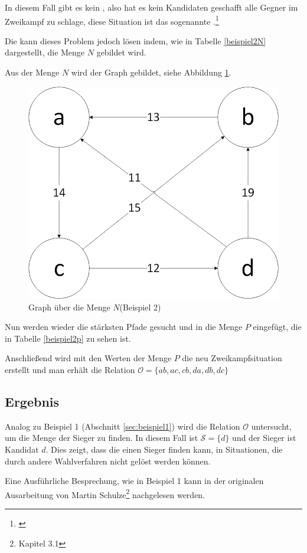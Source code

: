 In diesem Fall gibt es kein \condorcetSieger, also hat es kein Kandidaten geschafft alle Gegner im Zweikampf zu schlage, diese Situation ist das sogenannte \condorcetParadox.\footnote{\Vgl \citet{EnricoSchoebel2018}}

\newpage
Die \schulze kann dieses Problem jedoch lösen indem, wie in Tabelle \ref{beispiel2N} dargestellt, die Menge $N$ gebildet wird.



Aus der Menge $N$ wird der Graph gebildet, siehe Abbildung \ref{fig:graph2}.

\begin{figure}[!h]
\centering
\includegraphics[scale=0.5]{Bilder/Beispiel2_Graph.png}
\caption{Graph über die Menge $N$(Beispiel 2)}
\label{fig:graph2}
\end{figure}

Nun werden wieder die stärksten Pfade gesucht und in die Menge $P$ eingefügt, die in Tabelle \ref{beispiel2p} zu sehen ist.



Anschließend wird mit den Werten der Menge $P$ die neu Zweikampfsituation erstellt und man erhält die Relation $\mathcal{O} = \{ ab,ac,cb,da,db,dc \}$


\subsection{Ergebnis} 
\label{sec:ergebnis2}
Analog zu Beispiel 1 (Abschnitt \ref{sec:beispiel1}) wird die Relation $\mathcal{O}$ untersucht, um die Menge der Sieger zu finden. In diesem Fall ist $\mathcal{S}=\{d\}$  und der Sieger ist Kandidat $d$. Dies zeigt, dass die \schulze einen Sieger finden kann, in Situationen, die durch andere Wahlverfahren nicht gelöst werden können.

Eine Ausführliche Besprechung, wie in Beispiel 1 kann in der originalen Ausarbeitung von Martin Schulze\footnote{\Vgl \citet{Schulze2017} Kapitel 3.1} nachgelesen werden.
